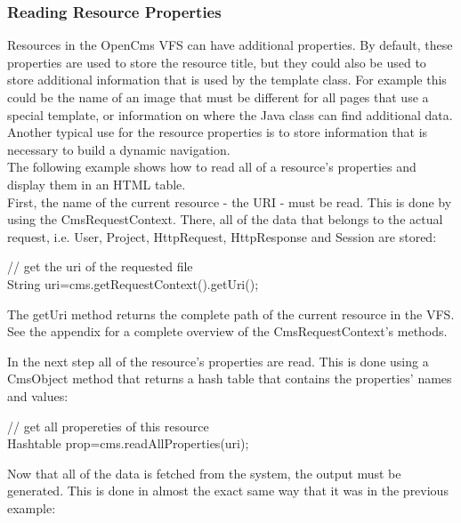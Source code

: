 \subsubsection{Reading Resource Properties}
Resources in the OpenCms VFS can have additional properties. By default,
these properties are used to store the resource title, but they could
also be used to store additional information that is used by the
template class. For example this could be the name of an image that
must be different for all pages that use a special template, or
information on where the Java class can find additional data. Another
typical use for the resource properties is to store information that is
necessary to build a dynamic navigation.\\

The following example shows how to read all of a resource's properties
and display them in an HTML table.\\

First, the name of the current resource - the URI - must be read. This
is done by using the {\name CmsRequestContext}. There, all of the data that
belongs to the actual request, i.e. User, Project, HttpRequest,
HttpResponse and Session are stored:\\

\begin{java}
// get the uri of the requested file\\
 String uri=cms.getRequestContext().getUri();\\
\end{java}

The getUri method returns the complete path of the current resource in
the VFS. See the appendix for a complete overview of the
{\name CmsRequestContext's} methods.

In the next step all of the {\name resource's} properties are read. This is
done using a CmsObject method that returns a hash table that contains
the {\name properties'} names and values:

\begin{java} 
// get all propereties of this resource\\
 Hashtable prop=cms.readAllProperties(uri);\\
\end{java}

Now that all of the data is fetched from the system, the output must be
generated. This is done in almost the exact same way that it was in the
previous example:

